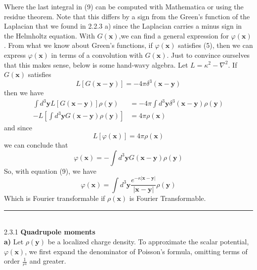 \documentclass[]{book}
\begin{document}
Where the last integral in (9) can be computed with Mathematica or using the residue theorem. Note that this differs by a sign from the Green's function of the Laplacian that we found in 2.2.3 a) since the Laplacian carries a minus sign in the Helmholtz equation. With $G(\textbf{x})$,we can find a general expression for $\varphi(\textbf{x})$. From what we know about Green's functions, if $\varphi(\textbf{x})$ satisfies (5), then we can express $\varphi(\textbf{x})$ in terms of a convolution with $G(\textbf{x})$. Just to convince ourselves that this makes sense, below is some hand-wavy algebra. Let $L = \kappa^2-\nabla^2$. If $G(\textbf{x})$ satisfies
\begin{equation}
L\left[G(\textbf{x}-\textbf{y})\right] = -4\pi\delta^3(\textbf{x}-\textbf{y})
\end{equation}
then we have \\
\begin{equation}
\begin{split}
\int d^3\textbf{y} L\left[G(\textbf{x}-\textbf{y})\right] \rho(\textbf{y}) &= -4\pi \int d^3\textbf{y} \delta^3(\textbf{x}-\textbf{y})\rho(\textbf{y}) \\
-L\left[\int d^3\textbf{y} G(\textbf{x}-\textbf{y})\rho(\textbf{y})\right] &= 4\pi \rho(\textbf{x})
\end{split}
\end{equation}
and since
\begin{equation}
L\left[\varphi(\textbf{x})\right] = 4\pi \rho(\textbf{x})
\end{equation}
we can conclude that
\begin{equation}
\varphi(\textbf{x}) = -\int d^3\textbf{y} G(\textbf{x}-\textbf{y})\rho(\textbf{y})
\end{equation}
So, with equation (9), we have
\begin{equation}
\varphi(\textbf{x}) = \int d^3\textbf{y} \frac{e^{-\kappa|\textbf{x}-\textbf{y}|}}{|\textbf{x}-\textbf{y}|}\rho(\textbf{y})
\end{equation}
Which is Fourier transformable if $\rho(\textbf{x})$ is Fourier Transformable. \\
\noindent\rule{15cm}{0.4pt} \\
{2.3.1 \hspace{0.5cm} \textbf{Quadrupole moments}} \\
\textbf{a)} Let $\rho(\textbf{y})$ be a localized charge density. To approximate the scalar potential, $\varphi(\textbf{x})$, we first expand the denominator of Poisson's formula, omitting terms of order $\frac{1}{r^4}$ and greater.
\end{document}
